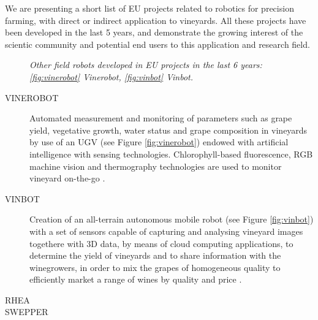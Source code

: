 We are presenting a short list of EU projects related to robotics for precision farming, with direct or indirect application to vineyards. All these projects have been developed in the last 5 years, and demonstrate the growing interest of the scientic community and potential end users to this application and research field.

\begin{figure}
	\centering
	\qquad
	\caption{\textit{Other field robots developed in EU projects in the last 6 years: \ref{fig:vinerobot} Vinerobot, \ref{fig:vinbot} Vinbot.}}
\end{figure}

\begin{description}
	\item[VINEROBOT] Automated measurement and monitoring of parameters such as grape yield, vegetative growth, water status and grape composition in vineyards by use of an \ac{UGV} (see Figure \ref{fig:vinerobot}) endowed with artificial intelligence with sensing technologies. Chlorophyll-based fluorescence, RGB machine vision and thermography technologies are used to monitor vineyard on-the-go \parencite{vinerobot}.
	\item[VINBOT] Creation of an all-terrain autonomous mobile robot (see Figure \ref{fig:vinbot}) with a set of sensors capable of capturing and analysing vineyard images togethere with 3D data, by means of cloud computing applications, to determine the yield of vineyards and to share information with the winegrowers, in order to mix the grapes of homogeneous quality to efficiently market a range of wines by quality and price \parencite{vinbot}.
	\item[RHEA]
	\item[SWEPPER]
\end{description}

